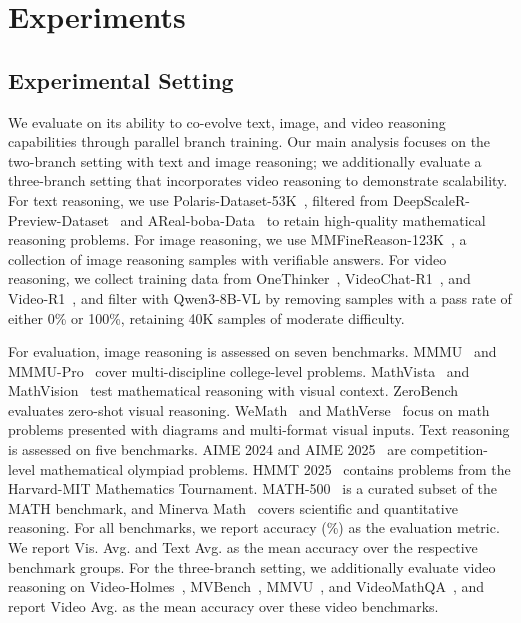 \section{Experiments} 
\label{sec:exps}
\subsection{Experimental Setting}
We evaluate \method on its ability to co-evolve text, image, 
and video reasoning capabilities through parallel branch 
training. Our main analysis focuses on the two-branch setting 
with text and image reasoning; we additionally evaluate a 
three-branch setting that incorporates video reasoning to 
demonstrate scalability. For text reasoning, we use 
Polaris-Dataset-53K~\cite{Polaris2025}, filtered from 
DeepScaleR-Preview-Dataset~\cite{deepscaler2025} and 
AReal-boba-Data~\cite{fu2025areal} to retain high-quality mathematical 
reasoning problems. For image reasoning, we use 
MMFineReason-123K~\cite{lin2026mmfinereason}, a collection of image reasoning 
samples with verifiable answers. For video reasoning, we collect training data from OneThinker~\cite{feng2025onethinker}, VideoChat-R1~\cite{li2025videochatr1enhancingspatiotemporalperception}, and Video-R1~\cite{feng2025videor1}, and filter with Qwen3-8B-VL by removing samples with a pass rate of either 0\% or 100\%, retaining 40K samples of moderate difficulty.

 For evaluation, image reasoning is assessed on seven benchmarks. MMMU~\cite{yue2024mmmumassivemultidisciplinemultimodal} and MMMU-Pro~\cite{yue2025mmmuprorobustmultidisciplinemultimodal} cover multi-discipline college-level problems. MathVista~\cite{lu2024mathvistaevaluatingmathematicalreasoning} and MathVision~\cite{wang2024measuring} test mathematical reasoning with visual context. ZeroBench~\cite{roberts2025zerobenchimpossiblevisualbenchmark} evaluates zero-shot visual reasoning. WeMath~\cite{qiao-etal-2025-math} and MathVerse~\cite{zhang2024mathversedoesmultimodalllm} focus on math problems presented with diagrams and multi-format visual inputs. Text reasoning is assessed on five benchmarks. AIME 2024 and AIME 2025~\cite{aime} are competition-level mathematical olympiad problems. HMMT 2025~\cite{balunovic_srimatharena_2025} contains problems from the Harvard-MIT Mathematics Tournament. MATH-500~\cite{math500hendrycks2021measuringmathematicalproblemsolving} is a curated subset of the MATH benchmark, and Minerva Math~\cite{lewkowycz2022solvingquantitativereasoningproblemsminerva} covers scientific and quantitative reasoning. For all benchmarks, we report accuracy (\%) as the evaluation metric. We report Vis. Avg. and Text Avg. as the mean accuracy over the respective benchmark groups. For the three-branch setting, we additionally evaluate video reasoning on Video-Holmes~\cite{cheng2025videoholmesmllmthinklike}, MVBench~\cite{li2024mvbenchcomprehensivemultimodalvideo}, MMVU~\cite{zhao2025mmvumeasuringexpertlevelmultidiscipline}, and VideoMathQA~\cite{rasheed2025videomathqabenchmarkingmathematicalreasoning}, and report Video Avg. as the mean accuracy over these video benchmarks.

